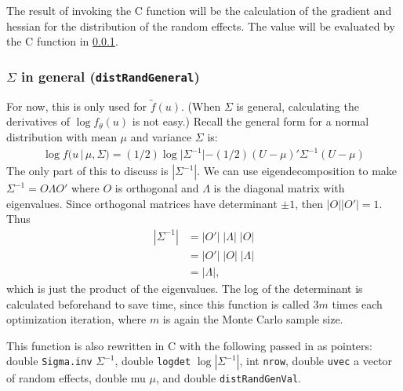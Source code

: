 \documentclass{article}
\begin{document}
The result of invoking the C function will be the calculation of the gradient and hessian for the distribution of the random effects. The value will be evaluated by the C function in \ref{sec:Dgeneral}.

\subsubsection{$\Sigma$ in general (\texttt{distRandGeneral})}\label{sec:Dgeneral}
For now, this is only used for $\tilde{f}(u)$. (When $\Sigma$ is general, calculating the derivatives of $\log f_\theta(u)$ is not easy.) Recall the general form for a normal distribution with mean $\mu$ and variance $\Sigma$ is:
\begin{align}
\log f(u \,| \,\mu, \Sigma) = (1/2) \log |\Sigma^{-1}| - (1/2) (U-\mu)' \Sigma^{-1} (U-\mu)
\end{align}
 The only part of this to discuss is $|\Sigma^{-1}|$. We can use eigendecomposition to make $\Sigma^{-1}=O \Lambda O'$ where $O$ is orthogonal and $\Lambda$ is the diagonal matrix with eigenvalues. Since orthogonal matrices have determinant $\pm 1$, then $|O||O'|=1$. Thus  
\begin{align}
|\Sigma^{-1}|&=|O'| \; |\Lambda| \; |O| \\
&= |O'| \; |O| \; |\Lambda| \\
&=|\Lambda|,
\end{align}
which is just the product of the eigenvalues. The log of the determinant is calculated beforehand to save time, since this function is called $3m$ times each optimization iteration, where $m$ is again the Monte Carlo sample size.

This function is also rewritten in C with the following  passed in as pointers: double \texttt{Sigma.inv} $\Sigma^{-1}$, double \texttt{logdet} $\log |\Sigma^{-1}|$, int \texttt{nrow}, double \texttt{uvec} a vector of random effects, double {mu} $\mu$, and double \texttt{distRandGenVal}.
\end{document}
